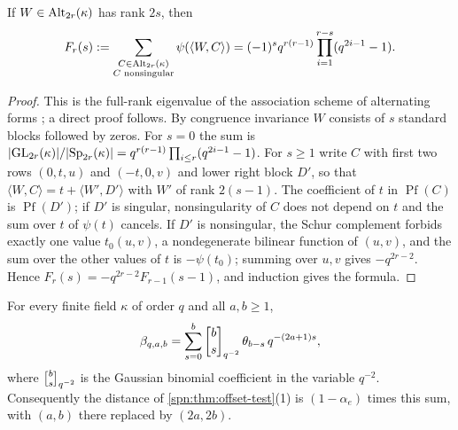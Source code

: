 \begin{lemma}\label{spn:lem:padic-fourier}
If $W\in\operatorname{Alt}_{2r}(\kappa)$ has rank $2s$, then
\[
 F_r(s):=\sum_{\substack{C\in\operatorname{Alt}_{2r}(\kappa)\\ C\text{ nonsingular}}}\psi(\langle W,C\rangle)
 =(-1)^sq^{r(r-1)}\prod_{i=1}^{r-s}(q^{2i-1}-1).
\]
\end{lemma}

\begin{proof}
This is the full-rank eigenvalue of the association scheme of alternating forms
\cite{DelsarteGoethals1975Alternating}; a direct proof follows. By congruence invariance $W$ consists of
$s$ standard blocks followed by zeros. For $s=0$ the sum is
$\lvert\operatorname{GL}_{2r}(\kappa)\rvert/\lvert\operatorname{Sp}_{2r}(\kappa)\rvert=q^{r(r-1)}\prod_{i\le r}(q^{2i-1}-1)$. For $s\ge1$ write
$C$ with first two rows $(0,t,u)$ and $(-t,0,v)$ and lower right block $D'$, so that
$\langle W,C\rangle=t+\langle W',D'\rangle$ with $W'$ of rank $2(s-1)$. The coefficient of $t$ in
$\operatorname{Pf}(C)$ is $\operatorname{Pf}(D')$; if $D'$ is singular, nonsingularity of $C$ does not
depend on $t$ and the sum over $t$ of $\psi(t)$ cancels. If $D'$ is nonsingular, the Schur complement
forbids exactly one value $t_0(u,v)$, a nondegenerate bilinear function of $(u,v)$, and the sum over the
other values of $t$ is $-\psi(t_0)$; summing over $u,v$ gives $-q^{2r-2}$. Hence
$F_r(s)=-q^{2r-2}F_{r-1}(s-1)$, and induction gives the formula.
\end{proof}

\begin{proposition}\label{spn:prop:padic-beta}
For every finite field $\kappa$ of order $q$ and all $a,b\ge1$,
\[
 \beta_{q,a,b}=\sum_{s=0}^{b}\spnqbin bs{q^{-2}}\,\theta_{b-s}\,q^{-(2a+1)s},
\]
where $\spnqbin bs{q^{-2}}$ is the Gaussian binomial coefficient in the variable $q^{-2}$. Consequently
the distance of \cref{spn:thm:offset-test}(1) is $(1-\alpha_e)$ times this sum, with $(a,b)$ there
replaced by $(2a,2b)$.
\end{proposition}

